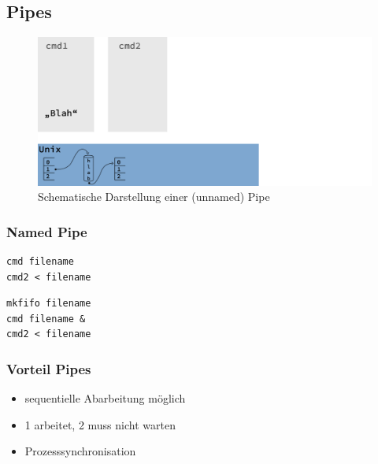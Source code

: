 	\subsection{Pipes} %
	\label{sub:pipes}
	
		\begin{figure}[ht]
			\caption{Schematische Darstellung einer (unnamed) Pipe}
			\includegraphics[width=\textwidth]{workfiles/v4_1}
		\end{figure}

		\subsubsection*{Named Pipe} %
		\label{ssub:named_pipe}

			\lstShell[Variante 1]
			\begin{lstlisting}
cmd filename
cmd2 < filename
			\end{lstlisting}

			\lstShell[Variante 2]
			\begin{lstlisting}
mkfifo filename
cmd filename &
cmd2 < filename
			\end{lstlisting}


		\subsubsection*{Vorteil Pipes} %
		\label{ssub:vorteil_pipes}
		
			\begin{itemize}
				\item sequentielle Abarbeitung möglich
				\item 1 arbeitet, 2 muss nicht warten
				\item Prozesssynchronisation
			\end{itemize}



